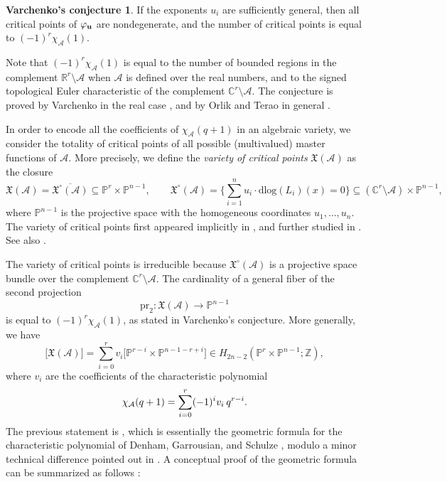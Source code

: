 \documentclass{compositio}
\theoremstyle{definition}
\newtheorem*{Var}{Varchenko's conjecture}
\theoremstyle{remark}
\begin{document}
\begin{Var}
If the exponents $u_i$ are sufficiently general, then all critical points of $\varphi_{\bf u}$ are nondegenerate, and
the number of critical points is equal to $(-1)^r \chi_\mathcal{A}(1)$.
\end{Var}

Note that $(-1)^r \chi_\mathcal{A}(1)$ is equal to the number of bounded regions in the complement $\mathbb{R}^r \setminus \mathcal{A}$ when $\mathcal{A}$ is defined over the real numbers, and to the signed topological Euler characteristic of the complement $\mathbb{C}^r \setminus \mathcal{A}$. The conjecture is proved by Varchenko in the real case \cite{Varchenko}, and by Orlik and Terao in general \cite{Orlik-Terao}.


In order to encode all the coefficients of $\chi_\mathcal{A}(q+1)$ in an algebraic variety, we consider the totality of critical points of all possible (multivalued) master functions of $\mathcal{A}$. More precisely, we define the \emph{variety of critical points} $\mathfrak{X}(\mathcal{A})$ as the closure
\[
\mathfrak{X}(\mathcal{A})=\overline{\mathfrak{X}^\circ(\mathcal{A})} \subseteq \mathbb{P}^r \times \mathbb{P}^{n-1}, \qquad \mathfrak{X}^\circ(\mathcal{A})=\Bigg\{\sum_{i=1}^n u_i \cdot \text{dlog}(L_i)(x)=0 \Bigg\} \subseteq (\mathbb{C}^r \setminus \mathcal{A}) \times \mathbb{P}^{n-1},
\]
where $\mathbb{P}^{n-1}$ is the projective space with the homogeneous coordinates $u_1,\ldots,u_n$. 
The variety of critical points first appeared implicitly in \cite{Orlik-Terao2}, and further studied in \cite{Cohen-Denham-Falk-Varchenko,Denham-Garrousian-Schulze}.
See also \cite[Section 2]{HuhML}.

The variety of critical points is irreducible because $\mathfrak{X}^\circ(\mathcal{A})$ is a projective space bundle over the complement $\mathbb{C}^r \setminus \mathcal{A}$.
The cardinality of a general fiber of the second projection 
\[
\text{pr}_2 : \mathfrak{X}(\mathcal{A}) \longrightarrow \mathbb{P}^{n-1}
\] 
is equal to $(-1)^r\chi_\mathcal{A}(1)$, as stated in Varchenko's conjecture. More generally, we have
\[
\big[\mathfrak{X}(\mathcal{A})\big] =
\sum_{i=0}^{r} v_i \big[ \mathbb{P}^{r-i} \times \mathbb{P}^{n-1-r+i}\big] \in H_{2n-2}(\mathbb{P}^r \times \mathbb{P}^{n-1};\mathbb{Z}),
\]
where $v_i$ are the coefficients of the characteristic polynomial
\[
\chi_\mathcal{A}(q+1)=\sum_{i=0}^{r} (-1)^i v_i \hspace{0.7mm} q^{r-i}.
\]
The previous statement is \cite[Corollary 3.11]{HuhML}, which is essentially the geometric formula for the characteristic polynomial of Denham, Garrousian, and Schulze \cite[Theorem 1.1]{Denham-Garrousian-Schulze}, modulo a minor technical difference pointed out in \cite[Remark 2.2]{HuhML}. 
A conceptual proof of the geometric formula can be summarized as follows \cite[Section 3]{HuhML}:
\end{document}

